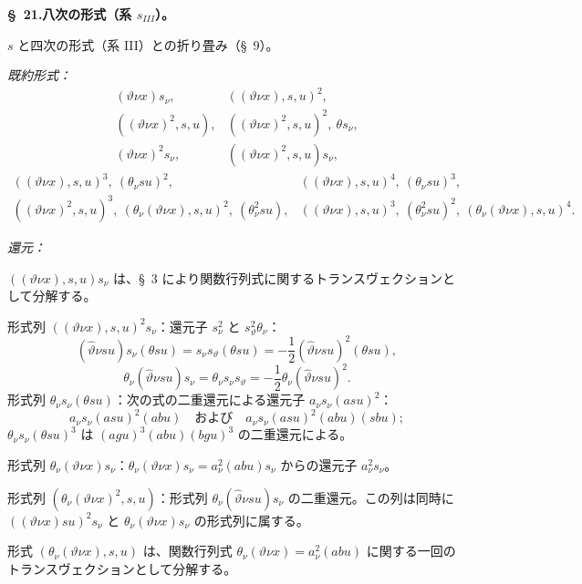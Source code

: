 \documentclass[11pt]{jlreq}
\begin{document}
\begin{center}
\textbf{\S\ 21.\quad 八次の形式（系 $s_{III}$）。}
\end{center}

$s$ と四次の形式（系 III）との折り畳み（\S\ 9）。

\noindent\emph{既約形式：}
\[
\begin{array}{lll}
(\vartheta\nu x)s_\nu,& ((\vartheta\nu x),s,u)^2,\\[-0.1em]
((\vartheta\nu x)^2,s,u),& ((\vartheta\nu x)^2,s,u)^2,\ \theta s_\nu,\\[-0.1em]
(\vartheta\nu x)^2s_\nu,& ((\vartheta\nu x)^2,s,u)s_\nu,
\end{array}
\]
\[
\begin{array}{lll}
((\vartheta\nu x),s,u)^3,\ (\theta_\nu su)^2,&
((\vartheta\nu x),s,u)^4,\ (\theta_\nu su)^3,\\[-0.1em]
((\vartheta\nu x)^2,s,u)^3,\ (\theta_\nu(\vartheta\nu x),s,u)^2,\ (\theta_\nu^2su),&
((\vartheta\nu x),s,u)^3,\ (\theta_\nu^2su)^2,\ (\theta_\nu(\vartheta\nu x),s,u)^4.
\end{array}
\]

\noindent\emph{還元：}

$((\vartheta\nu x),s,u)s_\nu$ は、\S\ 3 により関数行列式に関するトランスヴェクションとして分解する。

形式列 $((\vartheta\nu x),s,u)^2s_\nu$：還元子 $s_\nu^2$ と $s_\vartheta^2\theta_\nu$：
\[
(\widehat\vartheta\nu su)s_\nu(\theta su)=s_\nu s_\vartheta(\theta su)=-\frac12(\widehat\vartheta\nu su)^2(\theta su),
\]
\[
\theta_\nu(\widehat\vartheta\nu su)s_\nu=\theta_\nu s_\nu s_\vartheta=-\frac12\theta_\nu(\widehat\vartheta\nu su)^2.
\]
形式列 $\theta_\nu s_\nu(\theta su)$：次の式の二重還元による還元子 $a_\nu s_\nu(asu)^2$：
\[
a_\nu s_\nu(asu)^2(abu)\quad\text{および}\quad a_\nu s_\nu(asu)^2(abu)(sbu);
\]
$\theta_\nu s_\nu(\theta su)^3$ は $(agu)^3(abu)(bgu)^3$ の二重還元による。

形式列 $\theta_\nu(\vartheta\nu x)s_\nu$：$\theta_\nu(\vartheta\nu x)s_\nu=a_\nu^2(abu)s_\nu$ からの還元子 $a_\nu^2s_\nu$。

形式列 $(\theta_\nu(\vartheta\nu x)^2,s,u)$：形式列 $\theta_\nu(\widehat\vartheta\nu su)s_\nu$ の二重還元。この列は同時に $((\vartheta\nu x)su)^2s_\nu$ と $\theta_\nu(\vartheta\nu x)s_\nu$ の形式列に属する。

形式 $(\theta_\nu(\vartheta\nu x),s,u)$ は、関数行列式 $\theta_\nu(\vartheta\nu x)=a_\nu^2(abu)$ に関する一回のトランスヴェクションとして分解する。
\end{document}
